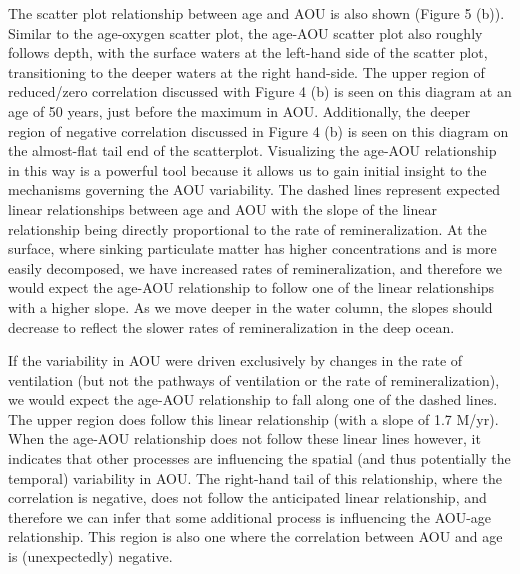 The scatter plot relationship between age and AOU is also shown (Figure 5 (b)).  Similar to the age-oxygen scatter plot, the age-AOU scatter plot also roughly follows depth, with the surface waters at the left-hand side of the scatter plot, transitioning to the deeper waters at the right hand-side. The upper region of reduced/zero correlation discussed with Figure 4 (b) is seen on this diagram at an age of 50 years, just before the maximum in AOU. Additionally, the deeper region of negative correlation discussed in Figure 4 (b) is seen on this diagram on the almost-flat tail end of the scatterplot. Visualizing the age-AOU relationship in this way is a powerful tool because it allows us to gain initial insight to the mechanisms governing the AOU variability. The dashed lines represent expected linear relationships between age and AOU with the slope of the linear relationship being directly proportional to the rate of remineralization. At the surface, where sinking particulate matter has higher concentrations and is more easily decomposed, we have increased rates of remineralization, and therefore we would expect the age-AOU relationship to follow one of the linear relationships with a higher slope. As we move deeper in the water column, the slopes should decrease to reflect the slower rates of remineralization in the deep ocean.

If the variability in AOU were driven exclusively by changes in the rate of ventilation (but not the pathways of ventilation or the rate of remineralization), we would expect the age-AOU relationship to fall along one of the dashed lines.  The upper region does follow this linear relationship (with a slope of 1.7  M/yr). When the age-AOU relationship does not follow these linear lines however, it indicates that other processes are influencing the spatial (and thus potentially the temporal) variability in AOU. The right-hand tail of this relationship, where the correlation is negative, does not follow the anticipated linear relationship, and therefore we can infer that some additional process is influencing the AOU-age relationship. This region is also one where the correlation between AOU and age is (unexpectedly) negative.

